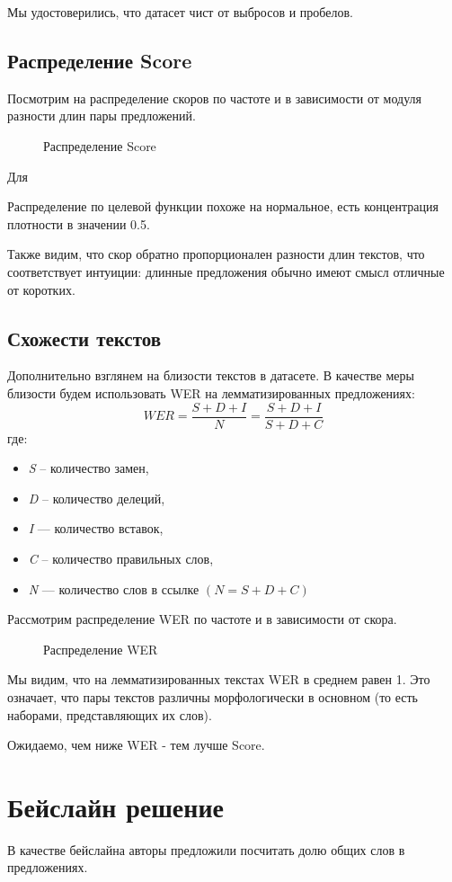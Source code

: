 \documentclass[12pt]{article}
\newcommand{\imgh}[3]
{
\begin{figure}[h]
\center{\texttt{[image: \#2]}}
\caption{#3}
\label{ris:#2}
\end{figure}
}
\begin{document}
Мы удостоверились, что датасет чист от выбросов и пробелов.

\subsection{Распределение Score}
Посмотрим на распределение скоров по частоте и в зависимости от модуля разности длин пары предложений.
\imgh{17cm}{score_distribution.png}{Распределение Score}
Для


Распределение по целевой функции похоже на нормальное, есть концентрация плотности в значении 0.5. 

Также видим, что скор обратно пропорционален разности длин текстов, что соответствует интуиции: длинные предложения обычно имеют смысл отличные от коротких.
\newpage

\subsection{Схожести текстов}
Дополнительно взглянем на близости текстов в датасете. В качестве меры близости будем использовать WER на лемматизированных предложениях:
$$ WER = \frac{S + D + I}{N} =  \frac{S + D + I}{S + D + C}$$
где:
\begin{itemize}
    \item \textit{S} – количество замен,
    \item \textit{D} – количество делеций,
    \item \textit{I} — количество вставок,
    \item \textit{C} – количество правильных слов,
    \item \textit{N} — количество слов в ссылке $(N = S + D + C)$
\end{itemize}

Рассмотрим распределение WER по частоте и в зависимости от скора. 

\imgh{17cm}{wer_distribution.png}{Распределение WER}

Мы видим, что на лемматизированных текстах WER в среднем равен 1. Это означает, что пары текстов различны морфологически в основном (то есть наборами, представляющих их слов).

Ожидаемо, чем ниже WER - тем лучше Score.
\newpage

\section{Бейслайн решение}

В качестве бейслайна авторы предложили посчитать долю общих слов в предложениях.
\end{document}
